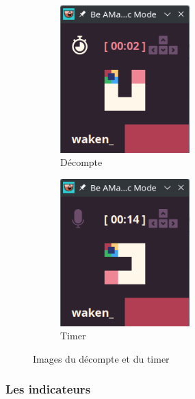 \begin{figure}[!htb]%
    \centering
    \begin{subfigure}{5cm}
        \includegraphics[width=5cm]{ressources/Implementation/Labyrinthe/Vue/CountdownTimer/CountDown.png}%
        \caption{Décompte}
        \label{fig:Countdown}
    \end{subfigure}
    \qquad
    \begin{subfigure}{5cm}
        \includegraphics[width=5cm]{ressources/Implementation/Labyrinthe/Vue/CountdownTimer/Timer.png}%
        \caption{Timer}
        \label{fig:Timer}
    \end{subfigure}
    \caption{Images du décompte et du timer}%
    \label{fig:CountdownAndTimer}
\end{figure}
\FloatBarrier

\subsubsection*{Les indicateurs}

\newcommand*\keystroke[1]{%
    \tikz[baseline=(key.base)]
    \node[%
        draw,
        fill=white,
        drop shadow={shadow xshift=0.25ex,shadow yshift=-0.25ex,fill=black,opacity=0.75},
        rectangle,
        rounded corners=2pt,
        inner sep=1pt,
        line width=0.5pt,
        font=\scriptsize\sffamily
    ](key) {#1\strut}
    ;
}

